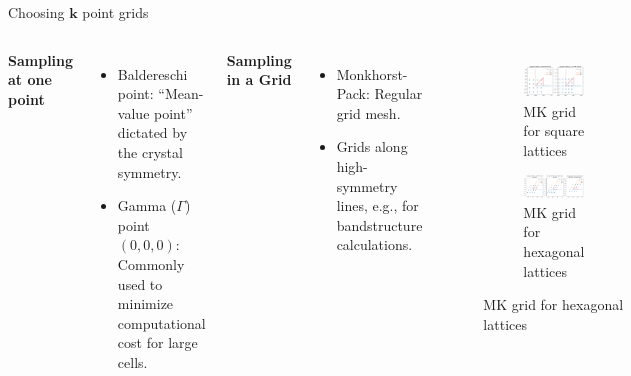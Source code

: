 \documentclass[aspectratio=169]{beamer}
\let \vec \mathbf
\begin{document}
    \begin{frame}{Choosing $\vec{k}$ point grids}

        \begin{columns}
            \textbf{Sampling at one point}
            \begin{itemize}
                \item Baldereschi point\cite{baldereschiMeanValuePointBrillouin1973}: ``Mean-value point'' dictated by the crystal symmetry.
                \item Gamma ($\Gamma$) point $(0,0,0)$: Commonly used to minimize computational cost for large cells.
            \end{itemize}

            \textbf{Sampling in a Grid}
            \begin{itemize}
                \item Monkhorst-Pack\cite{monkhorstSpecialPointsBrillouinzone1976}: Regular grid mesh.
                \item Grids along high-symmetry lines, e.g., for bandstructure calculations.
            \end{itemize}


            \begin{figure}
                \centering
                \begin{subfigure}{\textwidth}
                    \centering
                    \includegraphics[width=0.55\linewidth]{lectures/figures/7_monkhorst_square.png}
                    \caption{MK grid for square lattices}
                \end{subfigure}
                \begin{subfigure}{\textwidth}
                    \centering
                    \includegraphics[width=0.9\linewidth]{lectures/figures/7_monkhorst_hexagonal.png}
                    \caption{MK grid for hexagonal lattices}
                \end{subfigure}
            \end{figure}

        \end{columns}

    \end{frame}
\end{document}
